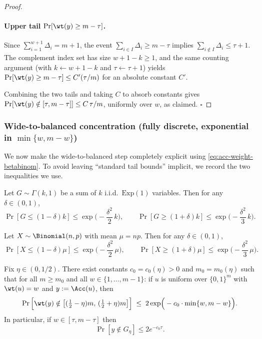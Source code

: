 \begin{proof}
\paragraph{Upper tail \(\Pr[\wt(y)\ge m-\tau]\).}
Since \(\sum_{i=1}^{w+1}\Delta_i=m+1\), the event \(\sum_{i\in I}\Delta_i\ge m-\tau\) implies
\(\sum_{i\notin I}\Delta_i\le \tau+1\). The complement index set has size \(w+1-k\ge 1\), and the same counting argument
(with \(k\leftarrow w+1-k\) and \(\tau\leftarrow \tau+1\)) yields \(\Pr[\wt(y)\ge m-\tau]\le C'(\tau/m)\) for an absolute constant \(C'\).

Combining the two tails and taking \(C\) to absorb constants gives
\(\Pr[\wt(y)\notin[\tau,m-\tau]]\le C\,\tau/m\), uniformly over \(w\), as claimed. \(\square\)
\end{proof}

\subsubsection{Wide-to-balanced concentration (fully discrete, exponential in \(\min\{w,m-w\}\))}
\label{sec:wide-to-balanced}

We now make the wide-to-balanced step completely explicit using \eqref{eq:acc-weight-betabinom}.
To avoid leaving “standard tail bounds” implicit, we record the two inequalities we use.

\begin{lemma}
\label{lem:gamma-chernoff}
Let \(G\sim \Gamma(k,1)\) be a sum of \(k\) i.i.d.\ \(\mathrm{Exp}(1)\) variables.
Then for any \(\delta\in(0,1)\),
\[
\Pr[G\le (1-\delta)k]\le \exp\!\Big(-\frac{\delta^2}{2}\,k\Big),
\qquad
\Pr[G\ge (1+\delta)k]\le \exp\!\Big(-\frac{\delta^2}{3}\,k\Big).
\]
\end{lemma}

\begin{lemma}
\label{lem:binom-chernoff}
Let \(X\sim \Binomial(n,p)\) with mean \(\mu=np\).
Then for any \(\delta\in(0,1)\),
\[
\Pr[X\le (1-\delta)\mu]\le \exp\!\Big(-\frac{\delta^2}{2}\,\mu\Big),
\qquad
\Pr[X\ge (1+\delta)\mu]\le \exp\!\Big(-\frac{\delta^2}{3}\,\mu\Big).
\]
\end{lemma}

\begin{lemma}
\label{lem:wide-to-balanced-betabinom}
Fix \(\eta\in(0,1/2)\). There exist constants \(c_0=c_0(\eta)>0\) and \(m_0=m_0(\eta)\) such that for all \(m\ge m_0\) and all
\(w\in\{1,\dots,m-1\}\):
if \(u\) is uniform over \(\{0,1\}^m\) with \(\wt(u)=w\) and \(y:=\Acc(u)\), then
\[
\Pr\Big[\wt(y)\notin\bigl[(\tfrac12-\eta)m,\,(\tfrac12+\eta)m\bigr]\Big]
\;\le\;
2\exp\!\Big(-c_0\cdot \min\{w,m-w\}\Big).
\]
In particular, if \(w\in[\tau,m-\tau]\) then
\[
\Pr[y\notin G_\eta]\le 2e^{-c_0\tau}.
\]
\end{lemma}

